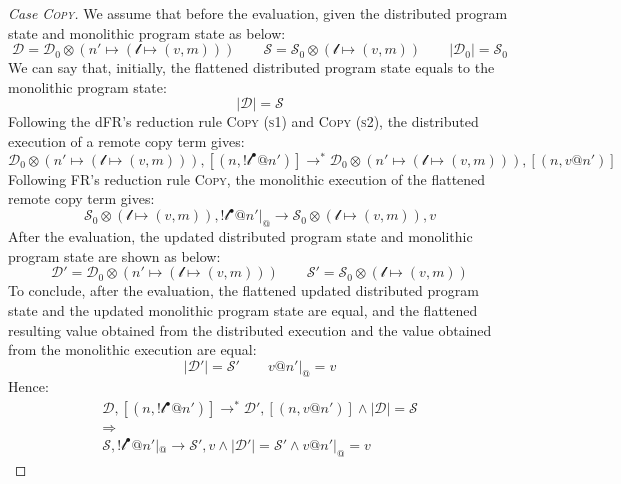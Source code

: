 \begin{proof}[Case \textsc{\emph{Copy}}]
We assume that before the evaluation, given the distributed program state and monolithic program state as below:
\[\mathcal{D} = \mathcal{D}_0 \otimes (n' \mapsto (\mathscr{l}\mapsto (v, m)))\quad\quad
\mathcal{S} = \mathcal{S}_0 \otimes (\mathscr{l} \mapsto (v, m)) \quad\quad |\mathcal{D}_0| = \mathcal{S}_0\]
We can say that, initially, the flattened distributed program state equals to the monolithic program state: 
\[|\mathcal{D}| = \mathcal{S}\]
Following the dFR's reduction rule \textsc{Copy (s1)} and \textsc{Copy (s2)}, the distributed execution of a remote copy term gives:
\[\mathcal{D}_0 \otimes (n' \mapsto (\mathscr{l} \mapsto (v,m))) , [(n, !\mathscr{l}^\bullet@n')] \longrightarrow^* \mathcal{D}_0 \otimes (n' \mapsto (\mathscr{l} \mapsto (v, m))), [(n, v@n')]\]
Following FR's reduction rule \textsc{Copy}, the monolithic execution of the flattened remote copy term gives:
\[\mathcal{S}_0 \otimes (\mathscr{l} \mapsto (v, m)), !\mathscr{l}^\bullet@n'|_@ \longrightarrow \mathcal{S}_0 \otimes (\mathscr{l} \mapsto (v, m)), v\]
After the evaluation, the updated distributed program state and monolithic program state are shown as below:
\[\mathcal{D}' = \mathcal{D}_0 \otimes (n' \mapsto (\mathscr{l} \mapsto (v, m))) \quad\quad 
\mathcal{S}' = \mathcal{S}_0 \otimes (\mathscr{l} \mapsto (v, m))\]
To conclude, after the evaluation, the flattened updated distributed program state and the updated monolithic program state are equal, and the flattened resulting value obtained from the distributed execution and the value obtained from the monolithic execution are equal:
\[
|\mathcal{D}'| = \mathcal{S}' \quad\quad v@n'|_@ = v
\]
Hence:
\begin{gather*}
\mathcal{D}, [(n, !\mathscr{l}^\bullet@n')] \longrightarrow^* \mathcal{D'}, [(n, v@n')] \land |\mathcal{D}| = \mathcal{S} \\\Rightarrow\\ \mathcal{S},  !\mathscr{l}^\bullet@n'|_@ \longrightarrow \mathcal{S'}, v \land |\mathcal{D}'| = \mathcal{S}' \land v@n'|_@ = v
\end{gather*}



\end{proof}
